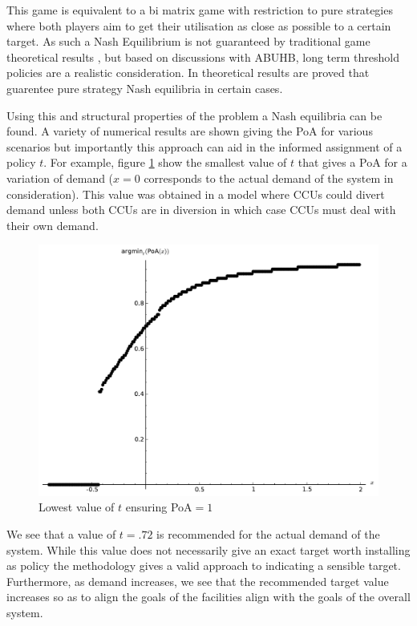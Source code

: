 \documentclass[a4paper,11pt]{article}
\begin{document}
This game is equivalent to a bi matrix game with restriction to pure strategies where both players aim to get their utilisation as close as possible to a certain target.
As such a Nash Equilibrium is not guaranteed by traditional game theoretical results \cite{Nash1950}, but based on discussions with ABUHB, long term threshold policies are a realistic consideration.
In \cite{knight2014} theoretical results are proved that guarentee pure strategy Nash equilibria in certain cases.

Using this and structural properties of the problem a Nash equilibria can be found.
A variety of numerical results are shown giving the PoA for various scenarios but importantly this approach can aid in the informed assignment of a policy $t$.
For example, figure \ref{mintargetvdemandmodel2} show the smallest value of $t$ that gives a PoA for a variation of demand ($x=0$ corresponds to the actual demand of the system in consideration).
This value was obtained in a model where CCUs could divert demand unless both CCUs are in diversion in which case CCUs must deal with their own demand.

\begin{figure}[!htbp]
\begin{center}
\includegraphics[width=12cm]{./Images/argminPoAmodel2.pdf}
\caption{Lowest value of $t$ ensuring PoA$=1$} \label{mintargetvdemandmodel2}
\end{center}
\end{figure}

We see that a value of $t=.72$ is recommended for the actual demand of the system.
While this value does not necessarily give an exact target worth installing as policy the methodology gives a valid approach to indicating a sensible target.
Furthermore, as demand increases, we see that the recommended target value increases so as to align the goals of the facilities align with the goals of the overall system.
\end{document}
